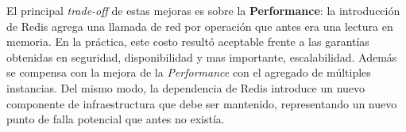El principal \textit{trade-off} de estas mejoras es sobre la \textbf{Performance}: la introducción de Redis agrega una llamada de red por operación que antes era una lectura en memoria. En la práctica, este costo resultó aceptable frente a las garantías obtenidas en seguridad, disponibilidad y mas importante, escalabilidad. Además se compensa con la mejora de la \textit{Performance} con el agregado de múltiples instancias. Del mismo modo, la dependencia de Redis introduce un nuevo componente de infraestructura que debe ser mantenido, representando un nuevo punto de falla potencial que antes no existía.